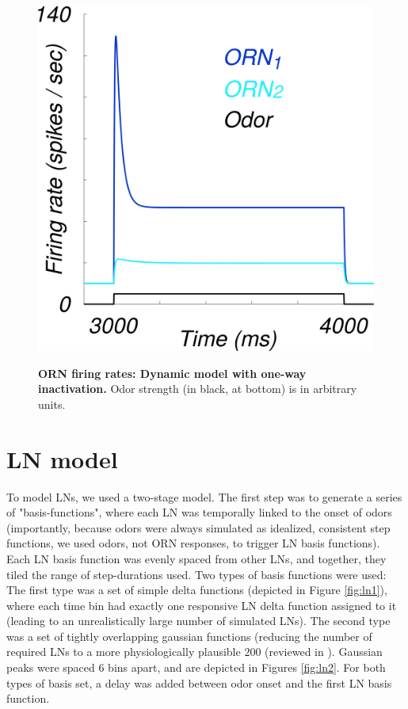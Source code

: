 \documentclass[a4paper,12pt,twoside]{article}
\begin{document}
\begin{figure}
\centering
\caption{\textbf{ORN firing rates: Dynamic model with one-way inactivation.}  Odor strength (in black, at bottom) is in arbitrary units.\newline}
\hspace*{-1cm}
\includegraphics[scale=0.6]{2016-08-19_ORN_dynamic_responses.png}
\label{fig:orn4}
\end{figure}

\section{LN model}
To model LNs, we used a two-stage model.  The first step was to generate a series of "basis-functions", where each LN was temporally linked to the onset of odors (importantly, because odors were always simulated as idealized, consistent step functions, we used odors, not ORN responses, to trigger LN basis functions).  Each LN basis function was evenly spaced from other LNs, and together, they tiled the range of step-durations used.   Two types of basis functions were used: The first type was a set of simple delta functions (depicted in Figure \ref{fig:ln1}), where each time bin had exactly one responsive LN delta function assigned to it (leading to an unrealistically large number of simulated LNs).  The second type was a set of tightly overlapping gaussian functions (reducing the number of required LNs to a more physiologically plausible $200$ (reviewed in \cite{Nagel2016}). Gaussian peaks were spaced $6$ bins apart, and are depicted in Figures \ref{fig:ln2}.  For both types of basis set, a delay was added between odor onset and the first LN basis function.
\end{document}
